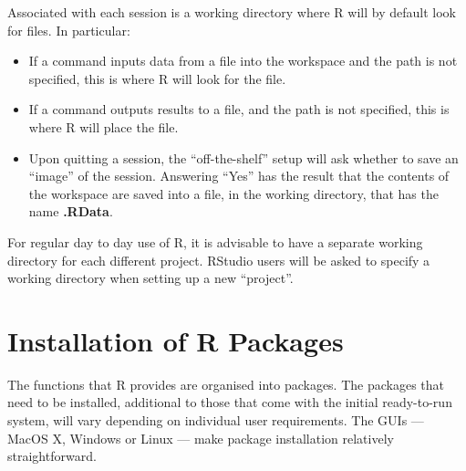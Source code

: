 \documentclass{tufte-book}\usepackage[]{graphicx}\usepackage[]{color}
\begin{document}
Associated with each session 
is a working directory where R will by default look
for files.  In particular:
\begin{itemize}
\item If a command inputs data from a file into the
workspace and the path is not specified, this is where R
will look for the file.
\item If a command outputs results to a file, and the path is not specified,
this is where R will place the file.
\item Upon quitting a session, the ``off-the-shelf'' setup will ask
  whether to save an ``image'' of the session. 
  Answering
  ``Yes'' has the result that the contents of the workspace are saved
  into a file, in the working directory, that has the name {\bf
    .RData}.  
\end{itemize}

For regular day to day use of R,
it is advisable to have a separate working
directory for each different project.
RStudio users will be asked to specify
a working directory when setting up a new ``project''.

\section{Installation of R Packages}\label{sec:pkgs}

\noindent
{}
\vspace*{6pt}

The functions that R provides are organised into packages.  The
packages that need to be installed, additional to those that come with
the initial ready-to-run system, will vary depending on individual
user requirements.  The GUIs --- MacOS X, Windows or Linux --- make
package installation relatively straightforward.
\end{document}
